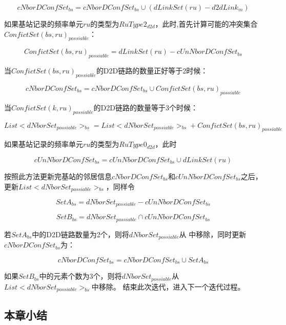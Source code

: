 \documentclass[figurelist,tablelist,algorithmlist,nomlist,masters]{seuthesix}
\begin{document}
\begin{enumerate}
	\begin{equation}\label{eq2.1}
	cNborDConfSe{t_{bs}} = cNborDConfSe{t_{bs}} \cup (dLinkSet(ru) - d2dLin{k_m})
	\end{equation}
	
	如果基站记录的频率单元$ru$的类型为$RuType{2_{d2d}}$，此时,首先计算可能的冲突集合$ConfictSet{(bs,ru)_{possiable}}$：
	
	\begin{equation}\label{eq2.1}
	ConfictSet{(bs,ru)_{possiable}} = dLinkSet(ru) - cUnNborDConfSe{t_{bs}}
	\end{equation}
	
	
	当$ConfictSet{(bs,ru)_{possiable}}$的D2D链路的数量正好等于2时候：
	
	\begin{equation}\label{eq2.1}
	cNborDConfSe{t_{bs}} = cNborDConfSe{t_{bs}} \cup ConfictSet{(bs,ru)_{possiable}}
	\end{equation}
	
	当$ConfictSet{(k,ru)_{possiable}}$的D2D链路的数量等于3个时候：
	
	\begin{equation}\label{eq2.1}
	List < dNborSe{t_{possiable}}{ > _{bs}} = List < dNborSe{t_{possiable}}{ > _{bs}} + ConfictSet{(bs,ru)_{possiable}}
	\end{equation}
	
	
	如果基站记录的频率单元$ru$的类型为$RuType{0_{d2d}}$，此时
	
	\begin{equation}\label{eq2.1}
	cUnNborDConfSe{t_{bs}} = cUnNborDConfSe{t_{bs}} \cup dLinkSet(ru)
	\end{equation}
	
	按照此方法更新完基站的邻居信息$cNborDConfSe{t_{bs}}$和$cUnNborDConfSe{t_{bs}}$之后，更新$List < dNborSe{t_{possiable}}{ > _{bs}}$，同样令
	
	\begin{equation}\label{eq2.1}
	Set{A_{bs}} = dNborSe{t_{possiable}} - cUnNborDConfSe{t_{bs}}
	\end{equation}
	
	\begin{equation}\label{eq2.1}
	Set{B_{bs}} = dNborSe{t_{possiable}} \cap cUnNborDConfSe{t_{bs}}
	\end{equation}
	
	若$Set{A_{bs}}$中的D2D链路数量为2个，则将$dNborSe{t_{possiable}}$从 中移除，同时更新$cNborDConfSe{t_{bs}}$为：
	
	\begin{equation}\label{eq2.1}
	cNborDConfSe{t_{bs}} = cNborDConfSe{t_{bs}} \cup Set{A_{bs}}
	\end{equation}
	
	如果$Set{B_{bs}}$中的元素个数为3个，则将$dNborSe{t_{possiable}}$从$List < dNborSe{t_{possiable}}{ > _{bs}}$中移除。 
	结束此次迭代，进入下一个迭代过程。
	
	\subsection{本章小结}
	
	\end{enumerate}
\end{document}
